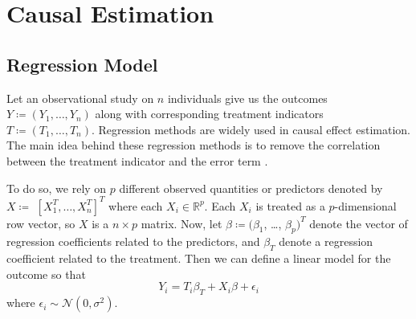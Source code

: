 \documentclass[preprint,12pt]{elsarticle}
\begin{document}
\section{Causal Estimation}\label{sec:causal}

\subsection{Regression Model}

Let an observational study on $n$ individuals give us
the outcomes $Y\coloneqq(Y_1, \dots, Y_n)$ along with 
corresponding treatment indicators $T\coloneqq(T_1, \dots, T_n)$.
Regression methods are widely used in causal effect estimation. The
main idea behind these regression methods is to remove the
correlation between the treatment indicator and the error term
\cite{winship99,HECKMAN1985}.




To do so, we rely on $p$ different observed quantities
or predictors denoted by $X\coloneqq$ $[X_1^T, \dots, X_n^T]^T$
where each $X_i\in\mathbb{R}^p$.
Each $X_i$ is treated as a $p$-dimensional row vector,
so $X$ is a $n\times p$ matrix.
Now, let
$\beta \coloneqq (\beta_1$, \dots, $\beta_p)^T$ denote the vector of regression
coefficients
related to the predictors, and $\beta_T$ denote a regression coefficient related to the treatment.
Then we can define a linear model for the outcome
so that
\begin{equation}
	Y_i =  T_i \beta_{T} + X_i\beta + \epsilon_i
\end{equation}
where $\epsilon_i\sim \mathcal{N}(0, \sigma^2)$.
\end{document}
